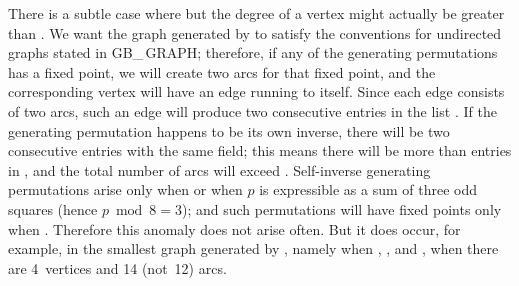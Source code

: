 There is a subtle case where  but the degree of a
vertex might
actually be greater than .
We want the graph  generated by  to satisfy the
conventions for undirected graphs stated in {\sc GB\_\,GRAPH}; therefore,
if any of the generating permutations has a fixed point, we will create
two arcs for that fixed point, and the corresponding vertex  will
have an edge running to itself. Since each edge consists of two arcs, such
an edge will produce two consecutive entries in the list .
If the generating permutation happens to be its own inverse,
there will be two consecutive entries with the same  field;
this means there will be more than  entries in ,
and the total number of arcs  will exceed .
Self-inverse generating permutations arise only when  or
when $p$ is expressible as a sum of three odd squares (hence
$p\bmod8=3$); and such permutations will have fixed points only when
. Therefore this anomaly does not arise often. But it does
occur, for example, in the smallest graph generated by , namely
when , , and , when
there are 4~vertices and 14 (not~12)
arcs.

